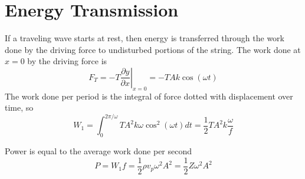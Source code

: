 \documentclass[11pt]{article}
\begin{document}
\section{Energy Transmission}
If a traveling wave starts at rest, then energy is transferred through the work done by the driving force to undisturbed portions of the string. The work done at $x = 0$ by the driving force is
	\begin{equation}
		F_T = -T \left. \frac{\partial y}{\partial x} \right|_{x=0} = -TAk\cos(\omega t)
	\end{equation}
	The work done per period is the integral of force dotted with displacement over time, so
	\begin{equation}
		W_1 = \int_0^{2\pi/\omega} TA^2k\omega\cos^2(\omega t)dt = \frac{1}{2}TA^2k\frac{\omega}{f}
	\end{equation}
	
	Power is equal to the average work done per second
	\begin{equation}
		P = W_1f = \frac{1}{2}\rho v_p \omega^2A^2 = \frac{1}{2}Z\omega^2 A^2
	\end{equation}


\end{document}

